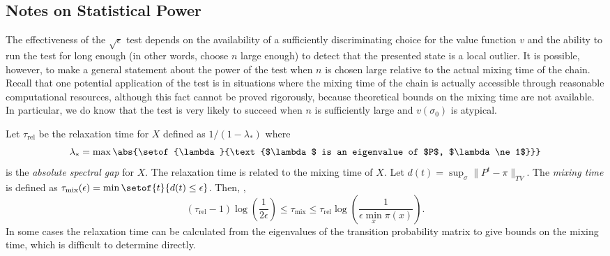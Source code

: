 \documentclass[12pt]{article}
\begin{document}
\subsection*{Notes on Statistical Power}

The effectiveness of the \( \sqrt{\epsilon} \) test depends on the
availability of a sufficiently discriminating choice for the value
function \( v \) and the ability to run the test for long enough (in
other words, choose \( n \) large enough) to detect that the presented
state is a local outlier.  It is possible, however, to make a general
statement about the power of the test when \( n \) is chosen large
relative to the actual mixing time of the chain.  Recall that one
potential application of the test is in situations where the mixing time
of the chain is actually accessible through reasonable computational
resources, although this fact cannot be proved rigorously, because
theoretical bounds on the mixing time are not available.  In particular,
we do know that the test is very likely to succeed when \( n \) is
sufficiently large and \( v(\sigma_0) \) is atypical.



\begin{remark}
    Let \( \tau_{\text{rel}} \) be the relaxation time%
    for \( X \) defined as \( 1/ (1-\lambda_*) \) where
    \[ \lambda_* =
    \max{\abs{\setof{\lambda}{\text{$\lambda$ is an eigenvalue of $P$,
            $\lambda \ne 1$}}}}
    \]
    is the \emph{absolute spectral gap} for \( X \). The relaxation time is
    related to the mixing time of \( X \).  Let \( d(t) =
    \sup_{\sigma} \| P^t - \pi \|_{TV} \).  The \emph{mixing time} is
    defined as \( \tau_{\text{mix}}(\epsilon) = \min\setof{t}{d(t) \le
      \epsilon} \).  Then, \cite[Theorems 12, 3, 12.4]{levin09},
    \[
      (\tau_{\text{rel}}-1) \log \left( \frac{1}{2\epsilon} \right)
      \le \tau_{\text{mix}} \le \tau_{\text{rel}} \log \left(
        \frac{1}{\epsilon \min_x \pi(x)} \right).
    \]
    In some cases the relaxation time can be calculated from the
    eigenvalues of the transition probability matrix to give bounds on
    the mixing time, which is difficult to determine directly.
\end{remark}
\end{document}
